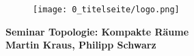 \begin{titlepage}
\vspace{1 cm}
\begin{figure}[h]
	\centering
	\texttt{[image: 0\_titelseite/logo.png]}
	\label{fig:logo}
\end{figure}

\vspace{2 cm}
\begin{center}
\Huge
\textbf{Seminar Topologie: Kompakte Räume}\\
\vspace{0.1 cm}
\Large
\textbf{Martin Kraus, Philipp Schwarz}
\vspace{1 cm}
\end{center}

\vfill

\end{titlepage}
